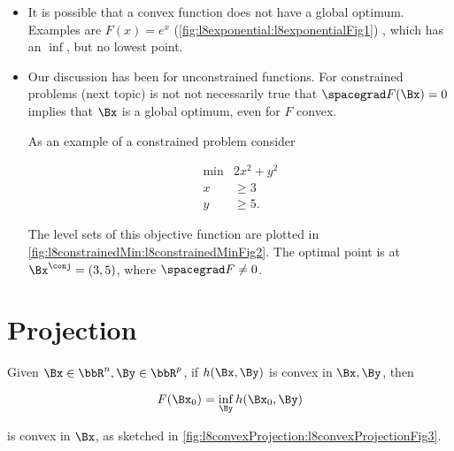 \begin{itemize}
\item It is possible that a convex function does not have a global optimum.  Examples are \( F(x) = e^x \)
(\cref{fig:l8exponential:l8exponentialFig1})
, which has an \( \inf \), but no lowest point.


\item Our discussion has been for unconstrained functions.  For constrained problems (next topic) is not not necessarily true that \( \spacegrad F(\Bx) = 0 \) implies that \( \Bx \) is a global optimum, even for \( F \) convex.

As an example of a constrained problem consider

\begin{dmath}\label{eqn:convexOptimizationLecture8:n}
\begin{aligned}
\min &2 x^2 + y^2 \\
x &\ge 3 \\
y &\ge 5.
\end{aligned}
\end{dmath}

The level sets of this objective function are plotted in \cref{fig:l8constrainedMin:l8constrainedMinFig2}.  The optimal point is at \( \Bx^\conj = (3,5) \), where \( \spacegrad F \ne 0 \).

\end{itemize}

\section{Projection}

Given \( \Bx \in \bbR^n, \By \in \bbR^p \), if \( h(\Bx,\By) \) is convex in \( \Bx, \By \), then

\begin{dmath}\label{eqn:convexOptimizationLecture8:60}
F(\Bx_0) = \inf_\By h(\Bx_0,\By)
\end{dmath}

is convex in \( \Bx\), as sketched in \cref{fig:l8convexProjection:l8convexProjectionFig3}.



